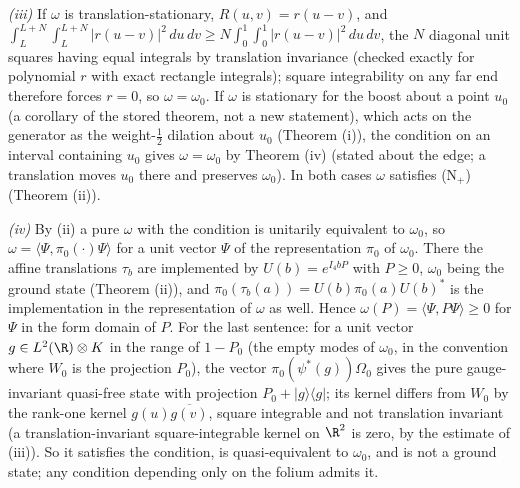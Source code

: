 \emph{(iii)} If $\omega$ is translation-stationary, $R(u, v) = r(u - v)$, and $\int_{L}^{L + N}\int_{L}^{L + N}|r(u - v)|^{2}\,du\,dv \ge N\int_{0}^{1}\int_{0}^{1}|r(u - v)|^{2}\,du\,dv$, the $N$ diagonal unit squares having equal integrals by translation invariance (checked exactly for polynomial $r$ with exact rectangle integrals); square integrability on any far end therefore forces $r = 0$, so $\omega = \omega_{0}$. If $\omega$ is stationary for the boost about a point $u_{0}$ (a corollary of the stored theorem, not a new statement), which acts on the generator as the weight-$\tfrac12$ dilation about $u_{0}$ (Theorem (i)), the condition on an interval containing $u_{0}$ gives $\omega = \omega_{0}$ by Theorem (iv) (stated about the edge; a translation moves $u_{0}$ there and preserves $\omega_{0}$). In both cases $\omega$ satisfies (N$_{+}$) (Theorem (ii)).

\emph{(iv)} By (ii) a pure $\omega$ with the condition is unitarily equivalent to $\omega_{0}$, so $\omega = \langle\Psi, \pi_{0}(\cdot)\Psi\rangle$ for a unit vector $\Psi$ of the representation $\pi_{0}$ of $\omega_{0}$. There the affine translations $\tau_{b}$ are implemented by $U(b) = e^{I_{4}bP}$ with $P \ge 0$, $\omega_{0}$ being the ground state (Theorem (ii)), and $\pi_{0}(\tau_{b}(a)) = U(b)\pi_{0}(a)U(b)^{*}$ is the implementation in the representation of $\omega$ as well. Hence $\omega(P) = \langle\Psi, P\Psi\rangle \ge 0$ for $\Psi$ in the form domain of $P$. For the last sentence: for a unit vector $g \in L^{2}(\R)\otimes K$ in the range of $1 - P_{0}$ (the empty modes of $\omega_{0}$, in the convention where $W_{0}$ is the projection $P_{0}$), the vector $\pi_{0}(\psi^{*}(g))\Omega_{0}$ gives the pure gauge-invariant quasi-free state with projection $P_{0} + |g\rangle\langle g|$; its kernel differs from $W_{0}$ by the rank-one kernel $g(u)\overline{g(v)}$, square integrable and not translation invariant (a translation-invariant square-integrable kernel on $\R^{2}$ is zero, by the estimate of (iii)). So it satisfies the condition, is quasi-equivalent to $\omega_{0}$, and is not a ground state; any condition depending only on the folium admits it.

